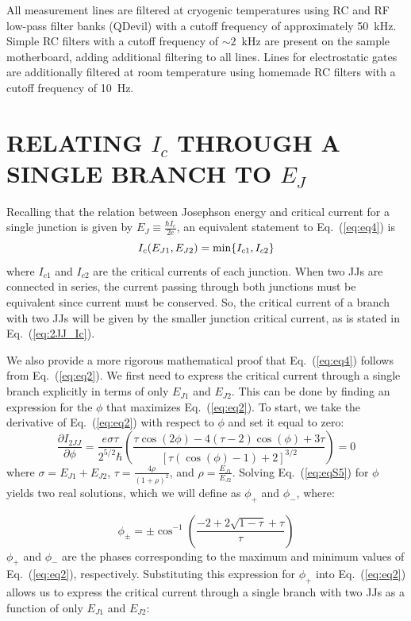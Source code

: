 \documentclass[%
 reprint,
 amsmath,amssymb,
 aps,
]{revtex4-2}
\begin{document}
All measurement lines are filtered at cryogenic temperatures using RC and RF low-pass filter banks (QDevil) with a cutoff frequency of approximately 50~kHz. Simple RC filters with a cutoff frequency of $\sim 2$~kHz are present on the sample motherboard, adding additional filtering to all lines. Lines for electrostatic gates are additionally filtered at room temperature using homemade RC filters with a cutoff frequency of 10~Hz.

\section{RELATING $I_c$ THROUGH A SINGLE BRANCH TO $E_J$}
\label{app:appC}
Recalling that the relation between Josephson energy and critical current for a single junction is given by $E_J\equiv\frac{\hbar I_c}{2e}$, an equivalent statement to Eq.~(\ref{eq:eq4}) is
\begin{equation}
    \label{eq:2JJ_Ic}
    I_c(E_{J1},E_{J2})=\textnormal{min}\{I_{c1},I_{c2}\}
\end{equation}
where $I_{c1}$ and $I_{c2}$ are the critical currents of each junction. When two JJs are connected in series, the current passing through both junctions must be equivalent since current must be conserved. So, the critical current of a branch with two JJs will be given by the smaller junction critical current, as is stated in Eq.~(\ref{eq:2JJ_Ic}).

We also provide a more rigorous mathematical proof that Eq.~(\ref{eq:eq4}) follows from Eq.~(\ref{eq:eq2}). We first need to express the critical current through a single branch explicitly in terms of only $E_{J1}$ and $E_{J2}$. This can be done by finding an expression for the $\phi$ that maximizes Eq.~(\ref{eq:eq2}). To start, we take the derivative of Eq.~(\ref{eq:eq2}) with respect to $\phi$ and set it equal to zero:
\begin{equation}
    \label{eq:eqS5}
    \frac{\partial I_{2JJ}}{\partial \phi} = \frac{e\sigma\tau}{2^{5/2}\hbar}\left(\frac{\tau \cos(2\phi)-4(\tau-2)\cos(\phi)+3\tau}{[\tau(\cos(\phi)-1)+2]^{3/2}}\right)=0
\end{equation}
where $\sigma=E_{J1}+E_{J2}$, $\tau=\frac{4\rho}{(1+\rho)^2}$, and $\rho=\frac{E_{J1}}{E_{J2}}$. Solving Eq.~(\ref{eq:eqS5}) for $\phi$ yields two real solutions, which we will define as $\phi_+$ and $\phi_-$, where:

\begin{equation}
    \label{eq:eqS6}
    \phi_{\pm}=\pm\cos^{-1}\left(\frac{-2+2\sqrt{1-\tau}+\tau}{\tau}\right)
\end{equation}
$\phi_+$ and $\phi_-$ are the phases corresponding to the maximum and minimum values of Eq.~(\ref{eq:eq2}), respectively. Substituting this expression for $\phi_+$ into Eq.~(\ref{eq:eq2}) allows us to express the critical current through a single branch with two JJs as a function of only $E_{J1}$ and $E_{J2}$:
\end{document}
